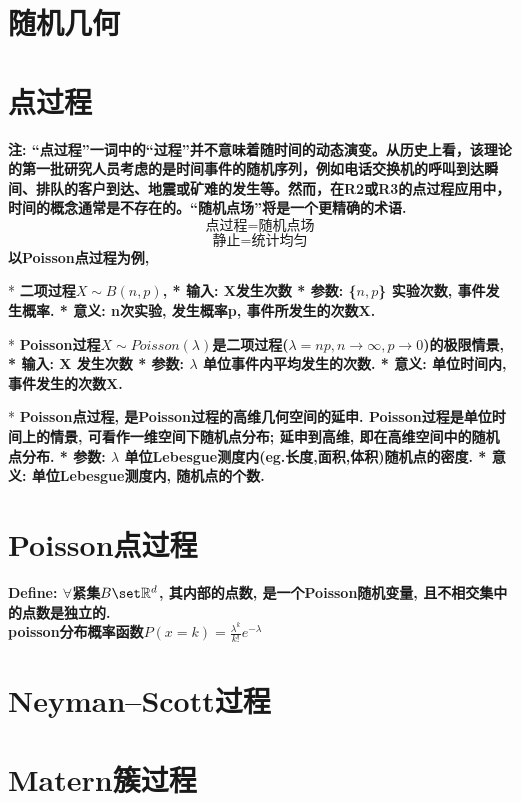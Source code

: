 \section{随机几何}
    \section{点过程}
        \bf{注}: “点过程”一词中的“过程”并不意味着随时间的动态演变。从历史上看，该理论的第一批研究人员考虑的是时间事件的随机序列，例如电话交换机的呼叫到达瞬间、排队的客户到达、地震或矿难的发生等。然而，在R2或R3的点过程应用中，时间的概念通常是不存在的。“随机点场”将是一个更精确的术语.
        $$\text{点过程} = \text{随机点场}$$
        $$\text{静止} = \text{统计均匀}$$
        以Poisson点过程为例,

        * \bf{二项过程}$X \sim B(n,p)$, 
            * 输入: X发生次数
            * 参数: \{$n, p$\} 实验次数, 事件发生概率.
            * 意义: n次实验, 发生概率p, 事件所发生的次数X.

            
        * \bf{Poisson过程}$X \sim Poisson(\lambda)$是二项过程($\lambda = np , n \to \infty, p \to 0$)的极限情景,
            * 输入: X 发生次数
            * 参数: $\lambda$ 单位事件内平均发生的次数.
            * 意义: 单位时间内, 事件发生的次数X.
            
            
        * \bf{Poisson点过程}, 是Poisson过程的高维几何空间的延申. Poisson过程是单位时间上的情景, 可看作一维空间下随机点分布; 延申到高维, 即在高维空间中的随机点分布.
            * 参数: $\lambda$ 单位Lebesgue测度内(eg.长度,面积,体积)随机点的密度.
            * 意义: 单位Lebesgue测度内, 随机点的个数.
            
        
        
        \section{Poisson点过程}
            \bf{Define}: $\forall$紧集$B \set \mathbb{R}^d$, 其内部的点数, 是一个Poisson随机变量, 且不相交集中的点数是独立的.\\
            poisson分布概率函数\quad $P(x = k) = \frac{\lambda^k}{k!} e^{-\lambda}$\\
            
        \section{Neyman–Scott过程}
            \section{Matern簇过程}
        

